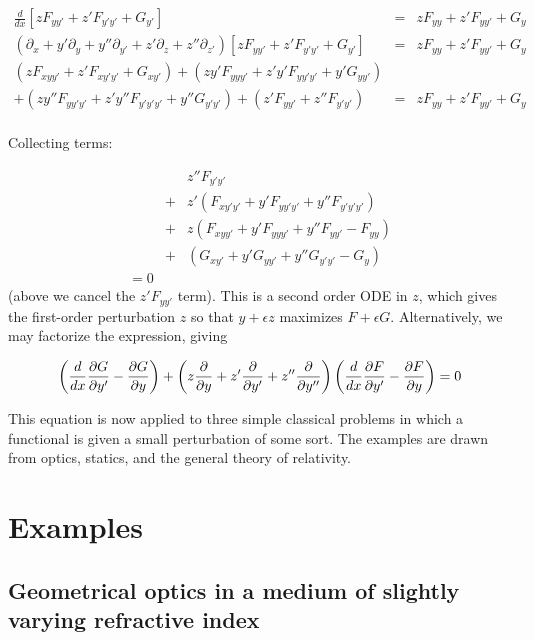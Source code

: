\documentclass[pdflatex,sn-mathphys-num]{sn-jnl}%
\theoremstyle{thmstyleone}%
\theoremstyle{thmstyletwo}%
\theoremstyle{thmstylethree}%
\begin{document}
\begin{eqnarray}
\frac{d}{dx}\left[zF_{yy'} + z'F_{y'y'} + G_{y'}\right]
&=& zF_{yy} + z'F_{yy'} + G_{y}\nonumber\\
\left(\partial_{x} + y'\partial_{y} + y''\partial_{y'} + z'\partial_{z} + z''\partial_{z'}\right)
\left[zF_{yy'} + z'F_{y'y'} + G_{y'}\right]
&=& zF_{yy} + z'F_{yy'} + G_{y}\nonumber\\
(zF_{xyy'} + z'F_{xy'y'} + G_{xy'})
+ (zy'F_{yyy'} + z'y'F_{yy'y'} + y'G_{yy'})\nonumber\\
+ ( zy''F_{yy'y'} + z'y''F_{y'y'y'} + y''G_{y'y'})
+ (z'F_{yy'} + z''F_{y'y'})
&=& zF_{yy} + z'F_{yy'} + G_{y}\nonumber\\
\end{eqnarray}

Collecting terms:

\begin{eqnarray}
&{}& z''F_{y'y'}\\
&+& z'(F_{xy'y'} + y'F_{yy'y'} + y''F_{y'y'y'})\\
&+& z (F_{xyy'} + y'F_{yyy'} + y''F_{yy'}-F_{yy})\\
&+& (G_{xy'} + y'G_{yy'} + y''G_{y'y'}- G_{y})\\
= 0
\end{eqnarray}
%
(above we cancel the $z'F_{yy'}$ term). This is a second order ODE in
$z$, which gives the first-order perturbation $z$ so that $y+\epsilon
z$ maximizes $F+\epsilon G$.  Alternatively, we may factorize the
expression, giving

\begin{equation}\label{factorized_eqn}
\left(\frac{d}{dx}\frac{\partial{G}}{\partial{y'}} - \frac{\partial{G}}{\partial{y}}\right) + \left(z\frac{\partial{}}{\partial{y}} + z'\frac{\partial{}}{\partial{y'}} + z''\frac{\partial{}}{\partial{y''}}\right)
\left(\frac{d}{dx}\frac{\partial{F}}{\partial{y'}} - \frac{\partial{F}}{\partial{y}}\right)=0
\end{equation}

This equation is now applied to three simple classical problems in
which a functional is given a small perturbation of some sort.  The
examples are drawn from optics, statics, and the general theory of
relativity.

\section{Examples}

\subsection{Geometrical optics in a medium of slightly varying refractive index}
\end{document}
